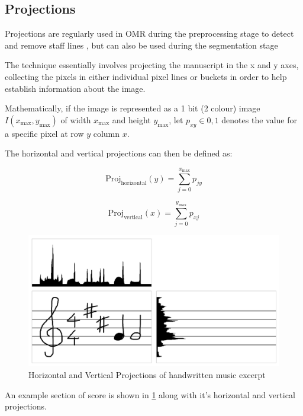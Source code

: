 \subsection{Projections}

Projections are regularly used in OMR during the preprocessing stage to detect and remove staff lines \parencite{rossant2002global}, but can also be used during the segmentation stage

The technique essentially involves projecting the manuscript in the x and y axes, collecting the pixels in either individual pixel lines or buckets in order to help establish information about the image.

Mathematically, if the image is represented as a 1 bit (2 colour) image $I(x_{\text{max}}, y_{\text{max}})$ of width $x_{\text{max}}$ and height $y_{\text{max}}$, let $p_{xy} \in 0, 1$ denotes the value for a specific pixel at row $y$ column $x$.

The horizontal and vertical projections can then be defined as:


\begin{equation} \label{eq:hproj}
  \text{Proj}_{\text{horizontal}}(y) = \sum_{j = 0}^{x_\text{max}} p_{jy}
\end{equation}

\begin{equation} \label{eq:vproj}
  \text{Proj}_{\text{vertical}}(x) = \sum_{j = 0}^{y_\text{max}} p_{xj}
\end{equation}

\begin{figure}[h!]
  \centering
  \includegraphics[width=\linewidth]{gfx/background-omr/projection.png}
  \caption{Horizontal and Vertical Projections of handwritten music excerpt}
  \label{fig:stave-projection}
\end{figure}

An example section of score is shown in \cref{fig:stave-projection} along with it's horizontal and vertical projections.


